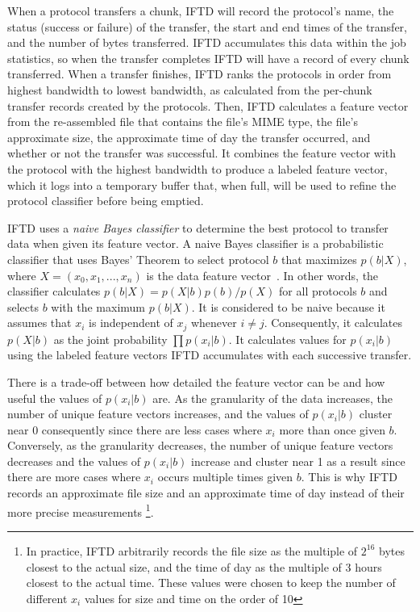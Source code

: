 When a protocol transfers a chunk, IFTD will record the protocol's name, the status (success or failure) of the transfer, the start and end times of the transfer, and the number of bytes transferred.  IFTD accumulates this data within the job statistics, so when the transfer completes IFTD will have a record of every chunk transferred.  When a transfer finishes, IFTD ranks the protocols in order from highest bandwidth to lowest bandwidth, as calculated from the per-chunk transfer records created by the protocols.  Then, IFTD calculates a feature vector from the re-assembled file that contains the file's MIME type, the file's approximate size, the approximate time of day the transfer occurred, and whether or not the transfer was successful.  It combines the feature vector with the protocol with the highest bandwidth to produce a labeled feature vector, which it logs into a temporary buffer that, when full, will be used to refine the protocol classifier before being emptied.

IFTD uses a \textit{naive Bayes classifier} to determine the best protocol to transfer data when given its feature vector.  A naive Bayes classifier is a probabilistic classifier that uses Bayes' Theorem to select protocol $b$ that maximizes $p(b|X)$, where $X = (x_0, x_1, ..., x_n)$ is the data feature vector~\cite{naivebayes}.  In other words, the classifier calculates $p(b|X) = p(X|b)p(b) / p(X)$ for all protocols $b$ and selects $b$ with the maximum $p(b|X)$.  It is considered to be naive because it assumes that $x_i$ is independent of $x_j$ whenever $i \neq j$.  Consequently, it calculates $p(X|b)$ as the joint probability $\prod p(x_i|b)$.  It calculates values for $p(x_i|b)$ using the labeled feature vectors IFTD accumulates with each successive transfer.

There is a trade-off between how detailed the feature vector can be and how useful the values of $p(x_i|b)$ are.  As the granularity of the data increases, the number of unique feature vectors increases, and the values of $p(x_i|b)$ cluster near 0 consequently since there are less cases where $x_i$ more than once given $b$.  Conversely, as the granularity decreases, the number of unique feature vectors decreases and the values of $p(x_i|b)$ increase and cluster near 1 as a result since there are more cases where $x_i$ occurs multiple times given $b$.  This is why IFTD records an approximate file size and an approximate time of day instead of their more precise measurements \footnote[3]{In practice, IFTD arbitrarily records the file size as the multiple of $2^{16}$ bytes closest to the actual size, and the time of day as the multiple of 3 hours closest to the actual time.  These values were chosen to keep the number of different $x_i$ values for size and time on the order of 10}.


